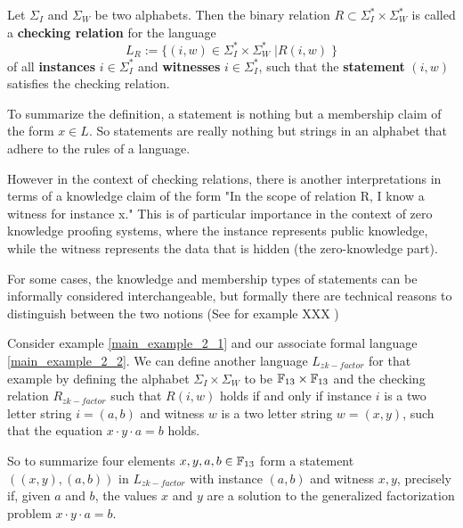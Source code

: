 \begin{definition} Let $\Sigma_I$ and $\Sigma_W$ be two alphabets. Then the binary relation $R\subset \Sigma_I^* \times \Sigma_W^*$ is called a \textbf{checking relation} for the language 
$$
L_R := \{(i,w) \in \Sigma_I^* \times \Sigma_W^*\;| R(i,w)\; \}
$$ 
of all \textbf{instances} $i\in \Sigma_I^*$ and \textbf{witnesses} $i\in \Sigma_I^*$, such that the \textbf{statement} $(i,w)$ satisfies the checking relation.
\end{definition}
\begin{remark}
To summarize the definition, a statement is nothing but a membership claim of the form $x\in L$. So statements are really nothing but strings in an alphabet that adhere to the rules of a language. 

However in the context of checking relations, there is another interpretations in terms of a knowledge claim of the form "In the scope of relation R, I know a witness for instance x." This is of particular importance in the context of zero knowledge proofing systems, where the instance represents public knowledge, while the witness represents the data that is hidden (the zero-knowledge part). 

For some cases, the knowledge and membership types of statements can be informally considered interchangeable, but formally there are technical reasons to distinguish between the two notions (See for example XXX
) 
\end{remark}
\begin{example}
\label{main_example_2_3}
Consider example \ref{main_example_2_1} and our associate formal language \ref{main_example_2_2}. We can define another language $L_{zk-factor}$ for that example by defining the alphabet $\Sigma_I \times \Sigma_W$ to be $\mathbb{F}_{13} \times \mathbb{F}_{13}$ and the checking relation $R_{zk-factor}$ such that
$R(i,w)$ holds if and only if instance $i$ is a two letter string $i=(a,b)$ and witness $w$ is a two letter string $w=(x,y)$, such that the equation $x\cdot y \cdot a = b$ holds. 

So to summarize four elements $x,y,a,b\in \mathbb{F}_{13}$ form a statement 
$((x,y),(a,b))$ in $L_{zk-factor}$ with instance $(a,b)$ and witness $x,y$, precisely if, given $a$ and $b$, the values $x$ and $y$ are a solution to the generalized factorization problem $x\cdot y \cdot a = b$.
\end{example}





